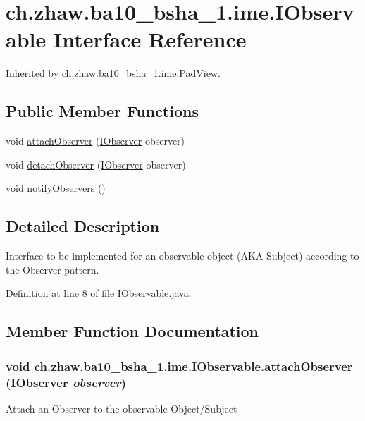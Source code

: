 \hypertarget{interfacech_1_1zhaw_1_1ba10__bsha__1_1_1ime_1_1IObservable}{
\section{ch.zhaw.ba10\_\-bsha\_\-1.ime.IObservable Interface Reference}
\label{interfacech_1_1zhaw_1_1ba10__bsha__1_1_1ime_1_1IObservable}
}


Inherited by \hyperlink{classch_1_1zhaw_1_1ba10__bsha__1_1_1ime_1_1PadView}{ch.zhaw.ba10\_\-bsha\_\-1.ime.PadView}.\subsection*{Public Member Functions}
\begin{DoxyCompactItemize}
\item 
void \hyperlink{interfacech_1_1zhaw_1_1ba10__bsha__1_1_1ime_1_1IObservable_ab05b466951c1b4c9c05644c27cf3fd9f}{attachObserver} (\hyperlink{interfacech_1_1zhaw_1_1ba10__bsha__1_1_1ime_1_1IObserver}{IObserver} observer)
\item 
void \hyperlink{interfacech_1_1zhaw_1_1ba10__bsha__1_1_1ime_1_1IObservable_a18a068196edc176c68282162bab22eff}{detachObserver} (\hyperlink{interfacech_1_1zhaw_1_1ba10__bsha__1_1_1ime_1_1IObserver}{IObserver} observer)
\item 
void \hyperlink{interfacech_1_1zhaw_1_1ba10__bsha__1_1_1ime_1_1IObservable_ade6befac243ff61d162ba09d6ff2e31d}{notifyObservers} ()
\end{DoxyCompactItemize}


\subsection{Detailed Description}
Interface to be implemented for an observable object (AKA Subject) according to the Observer pattern. 

Definition at line 8 of file IObservable.java.

\subsection{Member Function Documentation}
\hypertarget{interfacech_1_1zhaw_1_1ba10__bsha__1_1_1ime_1_1IObservable_ab05b466951c1b4c9c05644c27cf3fd9f}{
\subsubsection[{attachObserver}]{\setlength{\rightskip}{0pt plus 5cm}void ch.zhaw.ba10\_\-bsha\_\-1.ime.IObservable.attachObserver ({\bf IObserver} {\em observer})}}
\label{interfacech_1_1zhaw_1_1ba10__bsha__1_1_1ime_1_1IObservable_ab05b466951c1b4c9c05644c27cf3fd9f}
Attach an Observer to the observable Object/Subject 

